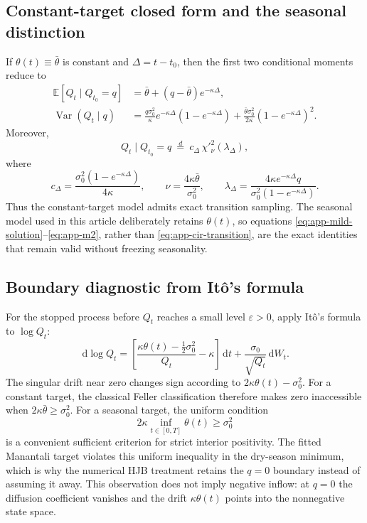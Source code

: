 \documentclass[11pt,a4paper]{article}
\newcommand{\E}{\mathbb{E}}
\newcommand{\dif}{\,\mathrm{d}}
\begin{document}
\subsection{Constant-target closed form and the seasonal distinction}
If $\theta(t)\equiv\bar\theta$ is constant and $\Delta=t-t_0$, then the first
two conditional moments reduce to
\begin{align}
 \E[Q_t\mid Q_{t_0}=q]
 &=\bar\theta+(q-\bar\theta)e^{-\kappa\Delta},
 \label{eq:app-cir-mean-constant}\\
 \operatorname{Var}(Q_t\mid q)
 &=\frac{q\sigma_0^2}{\kappa}e^{-\kappa\Delta}
   (1-e^{-\kappa\Delta})
 +\frac{\bar\theta\sigma_0^2}{2\kappa}
   (1-e^{-\kappa\Delta})^2.
 \label{eq:app-cir-var-constant}
\end{align}
Moreover,
\begin{equation}
 Q_t\mid Q_{t_0}=q\ \overset{d}{=}\
 c_\Delta\,\chi'^2_{\nu}(\lambda_\Delta),
 \label{eq:app-cir-transition}
\end{equation}
where
\begin{equation}
 c_\Delta=\frac{\sigma_0^2(1-e^{-\kappa\Delta})}{4\kappa},\qquad
 \nu=\frac{4\kappa\bar\theta}{\sigma_0^2},\qquad
 \lambda_\Delta=\frac{4\kappa e^{-\kappa\Delta}q}
 {\sigma_0^2(1-e^{-\kappa\Delta})}.
 \label{eq:app-cir-transition-par}
\end{equation}
Thus the constant-target model admits exact transition sampling. The seasonal model
used in this article deliberately retains $\theta(t)$, so equations
\eqref{eq:app-mild-solution}--\eqref{eq:app-m2}, rather than
\eqref{eq:app-cir-transition}, are the exact identities that remain valid without
freezing seasonality.

\subsection{Boundary diagnostic from It\^o's formula}
For the stopped process before $Q_t$ reaches a small level $\varepsilon>0$, apply
It\^o's formula to $\log Q_t$:
\begin{equation}
 \dif\log Q_t=\left[
 \frac{\kappa\theta(t)-\tfrac12\sigma_0^2}{Q_t}-\kappa
 \right]\dif t
 +\frac{\sigma_0}{\sqrt{Q_t}}\dif W_t.
 \label{eq:app-logito}
\end{equation}
The singular drift near zero changes sign according to
$2\kappa\theta(t)-\sigma_0^2$. For a constant target, the classical Feller
classification therefore makes zero inaccessible when
$2\kappa\bar\theta\ge\sigma_0^2$. For a seasonal target, the uniform condition
\begin{equation}
 2\kappa\inf_{t\in[0,T]}\theta(t)\ge\sigma_0^2
 \label{eq:app-uniform-feller}
\end{equation}
is a convenient sufficient criterion for strict interior positivity. The fitted
Manantali target violates this uniform inequality in the dry-season minimum, which
is why the numerical HJB treatment retains the $q=0$ boundary instead of assuming
it away. This observation does not imply negative inflow: at $q=0$ the diffusion
coefficient vanishes and the drift $\kappa\theta(t)$ points into the nonnegative
state space.
\end{document}
